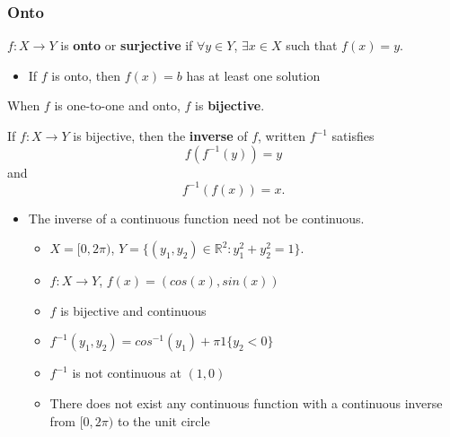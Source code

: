 \documentclass[compress]{beamer}
\def\R{\mathbb{R}}
\renewcommand{\to}{{\rightarrow}}
\begin{document}
\begin{frame}
  \frametitle{Onto}
  \begin{definition}
    $f:X \to Y$ is \textbf{onto} or \textbf{surjective} if $\forall y
    \in Y$, $\exists x \in X$ such that $f(x) = y$.
  \end{definition}
  \begin{itemize}
  \item If $f$ is onto, then $f(x) = b$ has at least one solution
  \end{itemize}
  \begin{definition} 
    When $f$ is one-to-one and onto, $f$ is \textbf{bijective}. 
  \end{definition}
  \begin{definition}
    If $f:X \to Y$ is bijective, then the \textbf{inverse} of $f$,
    written $f^{-1}$ satisfies
    \[ f(f^{-1} (y)) = y  \]
    and 
    \[ f^{-1} ( f(x) ) = x. \]
  \end{definition}
\end{frame}

\begin{frame}
  \begin{itemize}
  \item The inverse of a continuous function need not be continuous.
    \begin{example}
      \begin{itemize}
      \item $X = [0,2\pi)$, $Y = \{(y_1,y_2) \in \R^2 : y_1^2 + y_2^2
        = 1 \}$.  
      \item $f:X \to Y$, $f(x) = (cos(x), sin(x))$
      \item $f$ is bijective and continuous
      \item $f^{-1}(y_1,y_2) = cos^{-1}(y_1) + \pi 1\{y_2<0\}$
      \item $f^{-1}$ is not continuous at $(1,0)$ 
      \item There does not exist any continuous function with a
        continuous inverse from $[0,2\pi)$ to the unit circle
      \end{itemize}
    \end{example}
  \end{itemize}
\end{frame}
\end{document}
